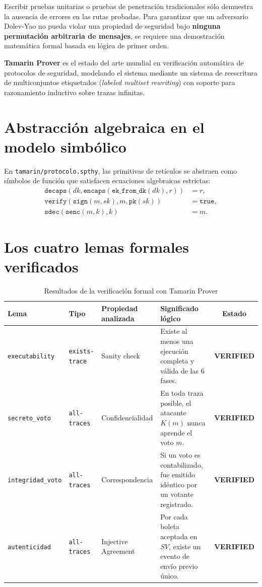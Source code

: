 \documentclass[11pt,a4paper,twoside,openright]{book}
\theoremstyle{plain}
\theoremstyle{definition}
\theoremstyle{remark}
\begin{document}
Escribir pruebas unitarias o pruebas de penetraci\'on tradicionales s\'olo demuestra la ausencia de errores en las rutas probadas. Para garantizar que un adversario Dolev-Yao no pueda violar una propiedad de seguridad bajo \textbf{ninguna permutaci\'on arbitraria de mensajes}, se requiere una demostraci\'on matem\'atica formal basada en l\'ogica de primer orden.

\textbf{Tamarin Prover} es el estado del arte mundial en verificaci\'on autom\'atica de protocolos de seguridad, modelando el sistema mediante un sistema de reescritura de multiconjuntos etiquetados (\emph{labeled multiset rewriting}) con soporte para razonamiento inductivo sobre trazas infinitas.

\section{Abstracci\'on algebraica en el modelo simb\'olico}

En \texttt{tamarin/protocolo.spthy}, las primitivas de ret\'iculos se abstraen como s\'imbolos de funci\'on que satisfacen ecuaciones algebraicas estrictas:
\begin{align*}
  \mathtt{decaps}(dk, \mathtt{encaps}(\mathtt{ek\_from\_dk}(dk), r)) &= r, \\
  \mathtt{verify}(\mathtt{sign}(m, sk), m, \mathtt{pk}(sk)) &= \mathtt{true}, \\
  \mathtt{sdec}(\mathtt{senc}(m, k), k) &= m.
\end{align*}

\section{Los cuatro lemas formales verificados}

\begin{table}[H]
\centering
\caption{Resultados de la verificaci\'on formal con Tamarin Prover}
\label{tab:tamarin_lemmas}
\begin{tabular}{lllp{4.5cm}c}
\toprule
\textbf{Lema} & \textbf{Tipo} & \textbf{Propiedad analizada} & \textbf{Significado l\'ogico} & \textbf{Estado} \\
\midrule
\texttt{executability} & \texttt{exists-trace} & Sanity check & Existe al menos una ejecuci\'on completa y v\'alida de las 6 fases. & \textbf{VERIFIED} \\
\texttt{secreto\_voto} & \texttt{all-traces} & Confidencialidad & En toda traza posible, el atacante $K(m)$ nunca aprende el voto $m$. & \textbf{VERIFIED} \\
\texttt{integridad\_voto} & \texttt{all-traces} & Correspondencia & Si un voto es contabilizado, fue emitido id\'entico por un votante registrado. & \textbf{VERIFIED} \\
\texttt{autenticidad} & \texttt{all-traces} & Injective Agreement & Por cada boleta aceptada en $SV$, existe un evento de env\'io previo \'unico. & \textbf{VERIFIED} \\
\bottomrule
\end{tabular}
\end{table}
\end{document}
